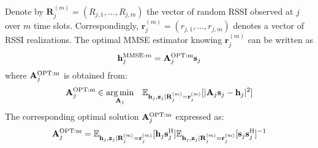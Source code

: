 \documentclass[francais]{gretsi}
\newcommand{\diag}{\mathrm{diag}}
\begin{document}
%
%

Denote by $\mathbf{R}_j^{(m)} = (R_{j,1},\dots,R_{j,m})$ the vector of random RSSI observed at $j$ over $m$ time slots.  Correspondingly, $\mathbf{r}_j^{(m)} = (r_{j,1},\dots,r_{j,m})$ denotes a vector of RSSI realizations. The optimal MMSE estimator knowing $\mathbf{r}_j^{(m)}$ can be written as
\begin{equation}\bold{h}_j^{\mathrm{MMSE}:m}=\bold{A}_j^{\mathrm{OPT:m}}\bold{s}_j\end{equation}
where $\bold{A}_j^{\mathrm{OPT:m}}$ is obtained from:
\begin{equation}
 \bold{A}_j^{\mathrm{OPT:m}}\in\underset{\bold{A}_j}{\arg\min} \quad \mathbb{E}_{\bold{h}_j,\bold{z}_j|\mathbf{R}_j^{(m)}=\mathbf{r}_j^{(m)}}[|\bold{A}_j\bold{s}_j-\bold{h}_j|^2]
\end{equation}
The corresponding optimal solution $\bold{A}_j^{\mathrm{OPT:m}}$ expressed as:
\begin{equation}
\bold{A}_j^{\mathrm{OPT:m}}=\mathbb{E}_{\bold{h}_j,\bold{z}_j|\mathbf{R}_j^{(m)}=\mathbf{r}_j^{(m)}}[\bold{h}_j\bold{s}_j^{\mathrm{H}}]\mathbb{E}_{\bold{h}_j,\bold{z}_j|\mathbf{R}_j^{(m)}=\mathbf{r}_j^{(m)}}[\bold{s}_j\bold{s}_j^{\mathrm{H}}]^{-1}
\label{eq:optimalAwithm}
\end{equation}
\end{document}

